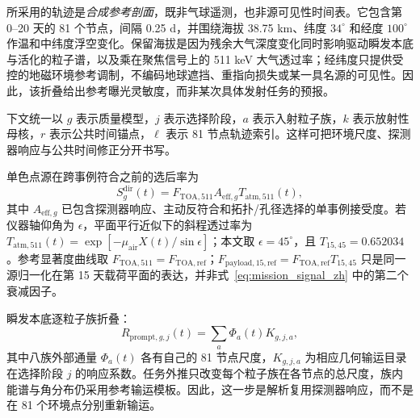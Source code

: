 \documentclass[11pt]{article}
\newcommand{\ftoaref}{F_{\mathrm{TOA,ref}}}
\newcommand{\fpayloadref}{F_{\mathrm{payload,15,ref}}}
\begin{document}
所采用的轨迹是\emph{合成参考剖面}，既非气球遥测，也非源可见性时间表。它包含第 0--20 天的 81 个节点，间隔 0.25 d，并围绕海拔 38.75 km、纬度 $34^\circ$ 和经度 $100^\circ$ 作温和中纬度浮空变化。保留海拔是因为残余大气深度变化同时影响驱动瞬发本底与活化的粒子谱，以及乘在聚焦信号上的 511 keV 大气透过率；经纬度只提供受控的地磁环境参考调制，不编码地球遮挡、重指向损失或某一具名源的可见性。因此，该折叠给出参考曝光灵敏度，而非某次具体发射任务的预报。

下文统一以 $g$ 表示质量模型，$j$ 表示选择阶段，$a$ 表示入射粒子族，$k$ 表示放射性母核，$r$ 表示公共时间锚点，$\ell$ 表示 81 节点轨迹索引。这样可把环境尺度、探测器响应与公共时间修正分开书写。

单色点源在跨事例符合之前的选后率为
\begin{equation}
 S^{\mathrm{dir}}_g(t)=F_{\mathrm{TOA},511}A_{\mathrm{eff},g}T_{\mathrm{atm},511}(t),
 \label{eq:mission_signal_zh}
\end{equation}
其中 $A_{\mathrm{eff},g}$ 已包含探测器响应、主动反符合和拓扑/孔径选择的单事例接受度。若仪器轴仰角为 $\epsilon$，平面平行近似下的斜程透过率为 $T_{\mathrm{atm},511}(t)=\exp[-\mu_{\mathrm{air}}X(t)/\sin\epsilon]$；本文取 $\epsilon=45^\circ$，且 $T_{15,45}=0.652034$。参考显著度曲线取 $F_{\mathrm{TOA},511}=\ftoaref$；$\fpayloadref=\ftoaref T_{15,45}$ 只是同一源归一化在第 15 天载荷平面的表达，并非式~\eqref{eq:mission_signal_zh} 中的第二个衰减因子。

瞬发本底逐粒子族折叠：
\begin{equation}
 R_{\mathrm{prompt},g,j}(t)=\sum_a\Phi_a(t)K_{g,j,a},
 \label{eq:prompt_source_response_zh}
\end{equation}
其中八族外部通量 $\Phi_a(t)$ 各有自己的 81 节点尺度，$K_{g,j,a}$ 为相应几何输运目录在选择阶段 $j$ 的响应系数。任务外推只改变每个粒子族在各节点的总尺度，族内能谱与角分布仍采用参考输运模板。因此，这一步是解析复用探测器响应，而不是在 81 个环境点分别重新输运。
\end{document}
